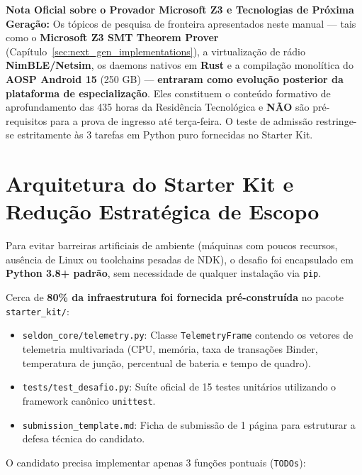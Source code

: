 \begin{atencao}
\textbf{Nota Oficial sobre o Provador Microsoft Z3 e Tecnologias de Próxima Geração:}
Os tópicos de pesquisa de fronteira apresentados neste manual — tais como o \textbf{Microsoft Z3 SMT Theorem Prover} (Capítulo~\ref{sec:next_gen_implementations}), a virtualização de rádio \textbf{NimBLE/Netsim}, os daemons nativos em \textbf{Rust} e a compilação monolítica do \textbf{AOSP Android 15} (250 GB) — \textbf{entraram como evolução posterior da plataforma de especialização}. Eles constituem o conteúdo formativo de aprofundamento das 435 horas da Residência Tecnológica e \textbf{NÃO} são pré-requisitos para a prova de ingresso até terça-feira. O teste de admissão restringe-se estritamente às 3 tarefas em Python puro fornecidas no Starter Kit.
\end{atencao}

\section{Arquitetura do Starter Kit e Redução Estratégica de Escopo}
\label{sec:starter_kit}

Para evitar barreiras artificiais de ambiente (máquinas com poucos recursos, ausência de Linux ou toolchains pesadas de NDK), o desafio foi encapsulado em \textbf{Python 3.8+ padrão}, sem necessidade de qualquer instalação via \texttt{pip}.

Cerca de \textbf{80\% da infraestrutura foi fornecida pré-construída} no pacote \texttt{starter\_kit/}:
\begin{itemize}
    \item \texttt{seldon\_core/telemetry.py}: Classe \texttt{TelemetryFrame} contendo os vetores de telemetria multivariada (CPU, memória, taxa de transações Binder, temperatura de junção, percentual de bateria e tempo de quadro).
    \item \texttt{tests/test\_desafio.py}: Suíte oficial de 15 testes unitários utilizando o framework canônico \texttt{unittest}.
    \item \texttt{submission\_template.md}: Ficha de submissão de 1 página para estruturar a defesa técnica do candidato.
\end{itemize}

O candidato precisa implementar apenas 3 funções pontuais (\texttt{TODOs}):

